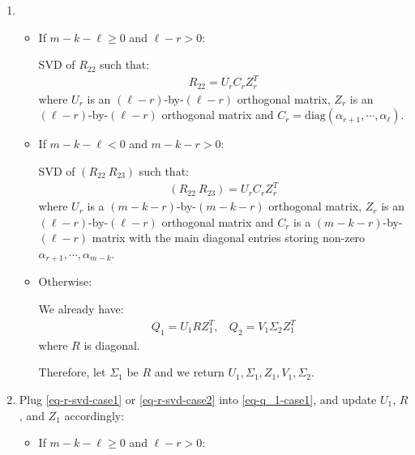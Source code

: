 \begin{enumerate}

\item 

\begin{itemize}
\item If $m - k - \ell \geq 0$ and $\ell - r > 0$:

SVD of $R_{22}$ such that:
\begin{align} \label{eq-r-svd-case1}
R_{22} = U_{r}C_{r}Z_{r}^{T}
\end{align}
where $U_{r}$ is an $(\ell-r)$-by-$(\ell-r)$ orthogonal matrix, 
$Z_{r}$ is an $(\ell-r)$-by-$(\ell-r)$ orthogonal matrix and $C_{r} = \mbox{diag}(\alpha_{r+1}, \cdots, \alpha_{\ell})$.

\item If $m - k - \ell < 0$ and $m - k - r > 0$:

SVD of $(R_{22} \ R_{23})$ such that:
\begin{align} \label{eq-r-svd-case2}
(R_{22} \ R_{23}) = U_{r}C_{r}Z_{r}^{T}
\end{align} 
where $U_{r}$ is a $(m-k-r)$-by-$(m-k-r)$ orthogonal matrix, 
$Z_{r}$ is an $(\ell-r)$-by-$(\ell-r)$ orthogonal matrix and $C_{r}$ 
is a $(m-k-r)$-by-$(\ell-r)$ matrix with the main diagonal entries 
storing non-zero $\alpha_{r+1}, \cdots, \alpha_{m-k}$.

\item Otherwise:

We already have:
\begin{align}
Q_1 = U_{1}RZ_{1}^{T}, \ \ \ \ Q_2 = V_{1}\Sigma_{2}Z_{1}^{T}
\end{align} 
where $R$ is diagonal. 

Therefore, let $\Sigma_{1}$ be $R$ and we return $U_{1}, \Sigma_{1}, Z_{1}, V_{1}, \Sigma_{2}$.  

\end{itemize}

\item 

Plug \eqref{eq-r-svd-case1} or \eqref{eq-r-svd-case2} into \eqref{eq-q_1-case1}, and  
update $U_{1}$, $R$, and $Z_{1}$ accordingly:

\begin{itemize}
\item If $m - k - \ell \geq 0$ and $\ell - r > 0$:


\end{itemize}
\end{enumerate}
